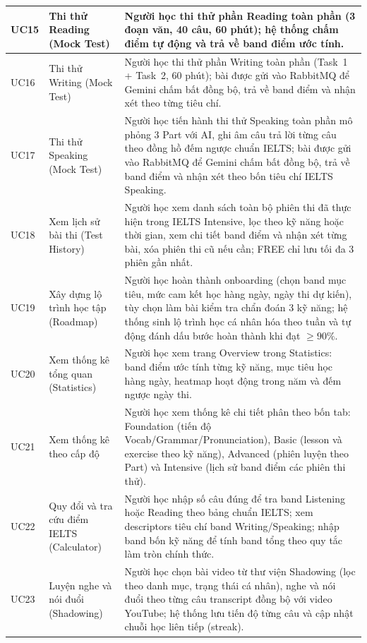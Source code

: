 \begin{longtable}{|p{15\tbu}|p{45\tbu}|p{90\tbu}|}
    UC15 & Thi thử Reading (Mock Test) & Người học thi thử phần Reading toàn phần (3 đoạn văn, 40 câu, 60 phút); hệ thống chấm điểm tự động và trả về band điểm ước tính. \\ \hline
    UC16 & Thi thử Writing (Mock Test) & Người học thi thử phần Writing toàn phần (Task~1 + Task~2, 60 phút); bài được gửi vào RabbitMQ để Gemini chấm bất đồng bộ, trả về band điểm và nhận xét theo từng tiêu chí. \\ \hline
    UC17 & Thi thử Speaking (Mock Test) & Người học tiến hành thi thử Speaking toàn phần mô phỏng 3 Part với AI, ghi âm câu trả lời từng câu theo đồng hồ đếm ngược chuẩn IELTS; bài được gửi vào RabbitMQ để Gemini chấm bất đồng bộ, trả về band điểm và nhận xét theo bốn tiêu chí IELTS Speaking. \\ \hline
    UC18 & Xem lịch sử bài thi (Test History) & Người học xem danh sách toàn bộ phiên thi đã thực hiện trong IELTS Intensive, lọc theo kỹ năng hoặc thời gian, xem chi tiết band điểm và nhận xét từng bài, xóa phiên thi cũ nếu cần; FREE chỉ lưu tối đa 3 phiên gần nhất. \\ \hline
    UC19 & Xây dựng lộ trình học tập (Roadmap) & Người học hoàn thành onboarding (chọn band mục tiêu, mức cam kết học hàng ngày, ngày thi dự kiến), tùy chọn làm bài kiểm tra chẩn đoán 3 kỹ năng; hệ thống sinh lộ trình học cá nhân hóa theo tuần và tự động đánh dấu bước hoàn thành khi đạt $\geq 90\%$. \\ \hline
    UC20 & Xem thống kê tổng quan (Statistics) & Người học xem trang Overview trong Statistics: band điểm ước tính từng kỹ năng, mục tiêu học hàng ngày, heatmap hoạt động trong năm và đếm ngược ngày thi. \\ \hline
    UC21 & Xem thống kê theo cấp độ & Người học xem thống kê chi tiết phân theo bốn tab: Foundation (tiến độ Vocab/Grammar/Pronunciation), Basic (lesson và exercise theo kỹ năng), Advanced (phiên luyện theo Part) và Intensive (lịch sử band điểm các phiên thi thử). \\ \hline
    UC22 & Quy đổi và tra cứu điểm IELTS (Calculator) & Người học nhập số câu đúng để tra band Listening hoặc Reading theo bảng chuẩn IELTS; xem descriptors tiêu chí band Writing/Speaking; nhập band bốn kỹ năng để tính band tổng theo quy tắc làm tròn chính thức. \\ \hline
    UC23 & Luyện nghe và nói đuổi (Shadowing) & Người học chọn bài video từ thư viện Shadowing (lọc theo danh mục, trạng thái cá nhân), nghe và nói đuổi theo từng câu transcript đồng bộ với video YouTube; hệ thống lưu tiến độ từng câu và cập nhật chuỗi học liên tiếp (streak). \\ \hline

\end{longtable}

